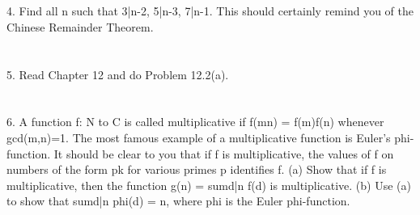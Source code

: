 \documentclass[letterpaper, 12pt, oneside]{memoir}
\theoremstyle{mystyle}
\begin{document}
\section{} 
4. Find all n such that  3|n-2, 5|n-3, 7|n-1. This should certainly remind you of the Chinese Remainder Theorem. 
\section{} 
5. Read Chapter 12 and do Problem 12.2(a). 
\section{} 
6. A function f: N to C is called multiplicative if f(mn) = f(m)f(n) whenever gcd(m,n)=1. The most famous example of a multiplicative function is Euler's phi-function. It should be clear to you that if f is multiplicative, the values of f on numbers of the form pk for various primes p identifies f. 
(a) Show that if f is multiplicative, then the function g(n) = sumd|n f(d) is multiplicative. 
(b) Use (a) to show that sumd|n phi(d) = n, where phi is the Euler phi-function. 
\end{document}
